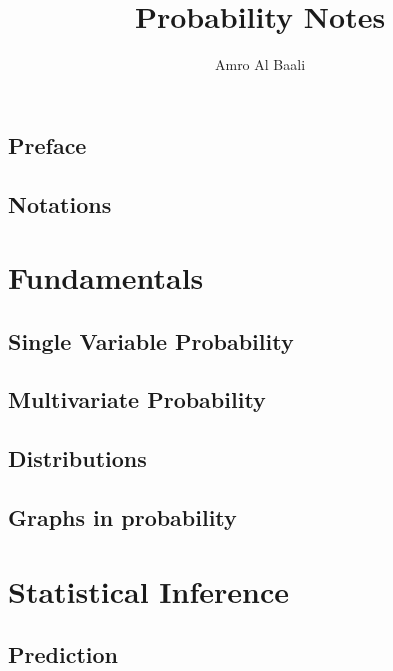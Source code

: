 \documentclass{amro-notes}
\title{Probability Notes}
\author{Amro Al Baali}
\date{\daterange}
\begin{document}
\maketitle
\tableofcontents
{} 


\chapter*{Preface}


\clearpage
\chapter*{Notations}


\clearpage
{} 
\part{Fundamentals}
\label{part:fundamentals}

\chapter{Single Variable Probability}


\clearpage
\chapter{Multivariate Probability}


\clearpage
\chapter{Distributions}


\clearpage
\chapter{Graphs in probability}


\clearpage
\part{Statistical Inference}

\chapter{Prediction}

\end{document}
